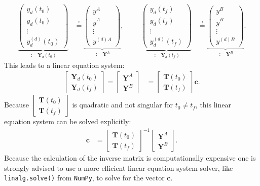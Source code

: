 \documentclass[a4paper,12pt,headinclude=true,headsepline,parskip=half,DIV=12]{scrartcl}
\newcommand{\code}[1]{\lstinline[basicstyle=\normalsize\sffamily]|#1|}
\begin{document}
\begin{align*}
  \underbrace{\begin{pmatrix} y_d(t_0) \\ \dot{y}_d(t_0) \\ \vdots \\ y_d^{(d)}(t_0) \end{pmatrix}}_{:=\mathbf{Y}_d(t_0)}
   & \overset{!}{=}
  \underbrace{\begin{pmatrix} y^A \\ \dot{y}^A \\ \vdots \\ y^{(d)A}  \end{pmatrix}}_{:=\mathbf{Y}^A},
   &                &  &
  \underbrace{\begin{pmatrix} y_d(t_f) \\ \dot{y}_d(t_f) \\ \vdots \\ y_d^{(d)}(t_f) \end{pmatrix}}_{:=\mathbf{Y}_d(t_f)}
   & \overset{!}{=}
  \underbrace{\begin{pmatrix} y^B \\ \dot{y}^B \\ \vdots \\ y^{(d)B}  \end{pmatrix}}_{:=\mathbf{Y}^B}.
\end{align*}
This leads to a linear equation system:
\begin{align*}
  \begin{bmatrix}
    \mathbf{Y}_d(t_0) \\
    \mathbf{Y}_d(t_f)
  \end{bmatrix}
  =
  \begin{bmatrix}
    \mathbf{Y}^A \\
    \mathbf{Y}^B
  \end{bmatrix}
   & =
  \begin{bmatrix}
    \mathbf{T}(t_0) \\
    \mathbf{T}(t_f)
  \end{bmatrix}
  \mathbf{c}.
\end{align*}
Because $\begin{bmatrix}
    \mathbf{T}(t_0) \\
    \mathbf{T}(t_f)
  \end{bmatrix}$ is quadratic and not singular for $t_0\neq t_f$, this linear equation system can be solved explicitly:
\begin{align}
  \label{eq:2}
  \mathbf{c} & = \begin{bmatrix}
                   \mathbf{T}(t_0) \\
                   \mathbf{T}(t_f)
                 \end{bmatrix}^{-1}
  \begin{bmatrix}
    \mathbf{Y}^A \\
    \mathbf{Y}^B
  \end{bmatrix}.
\end{align}
Because the calculation of the inverse matrix is computationally expensive one is strongly advised to use a more efficient  linear equation system solver, like \code{linalg.solve()}  from \code{NumPy}, to solve for the vector $\mathbf{c}$.
\end{document}
